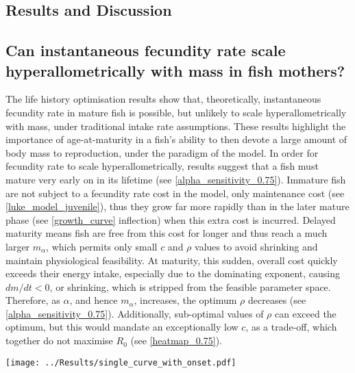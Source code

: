\documentclass[a4paper]{article} %
\begin{document}
\begin{center}
\begin{minipage}{\linewidth}
\section{Results and Discussion}\thispagestyle{plain}
\subsection{Can instantaneous fecundity rate scale hyperallometrically with mass in fish mothers?}
The life history optimisation results show that, theoretically, instantaneous fecundity rate in mature fish is possible, but unlikely to scale hyperallometrically with mass, under traditional intake rate assumptions. These results highlight the importance of age-at-maturity in a fish's ability to then devote a large amount of body mass to reproduction, under the paradigm of the model. In order for fecundity rate to scale hyperallometrically, results suggest that a fish must mature very early on in its lifetime (see \cref{alpha_sensitivity_0.75}). Immature fish are not subject to a fecundity rate cost in the model, only maintenance cost (see \cref{luke_model_juvenile}), thus they grow far more rapidly than in the later mature phase (see \cref{growth_curve} inflection) when this extra cost is incurred. Delayed maturity means fish are free from this cost for longer and thus reach a much larger $m_{\alpha}$, which permits only small $c$ and $\rho$ values to avoid shrinking and maintain physiological feasibility. At maturity, this sudden, overall cost quickly exceeds their energy intake, especially due to the dominating exponent, causing $dm/dt < 0$, or shrinking, which is stripped from the feasible parameter space. Therefore, as $\alpha$, and hence $m_{\alpha}$, increases, the optimum $\rho$ decreases (see \cref{alpha_sensitivity_0.75}). Additionally, sub-optimal values of $\rho$ can exceed the optimum, but this would mandate an exceptionally low $c$, as a trade-off, which together do not maximise $R_0$ (see \cref{heatmap_0.75}).

\begin{center}
    \begin{minipage}{0.8\linewidth}
        \texttt{[image: ../Results/single\_curve\_with\_onset.pdf]}
        \label{growth_curve}
    \end{minipage}\\
\end{center}


\end{minipage}
\end{center}
\end{document}
